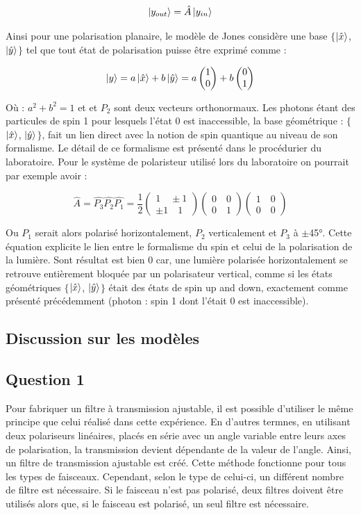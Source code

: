 \documentclass[11pt,letterpaper]{article}
\newcommand*{\Coord}[2]{%
    \begin{pmatrix} 
      #1\\ 
      #2 
    \end{pmatrix}}
\begin{document}
\begin{equation*}
    \ket{y_{out}} = \hat{A}\ket{y_{in}}
\end{equation*}

Ainsi pour une polarisation planaire, le modèle de Jones considère une base $\{$$\ket{\hat{x}}$, $\ket{\hat{y}}$$\}$ tel que tout état de polarisation puisse être exprimé comme :

\begin{equation*}
    \ket{y} = a\ket{\hat{x}} + b\ket{\hat{y}} = a\Coord{1}{0} + b\Coord{0}{1}
\end{equation*}

Où : $a^2 + b^2 = 1$ et et $P_2$  sont deux vecteurs orthonormaux. Les photons étant des particules de spin 1 pour lesquels l'état 0 est inaccessible, la base géométrique : $\{$$\ket{\hat{x}}$, $\ket{\hat{y}}$$\}$, fait un lien direct avec la notion de spin quantique au niveau de son formalisme. Le détail de ce formalisme est présenté dans le procédurier du laboratoire. Pour le système de polaristeur utilisé lors du laboratoire on pourrait par exemple avoir : 

\begin{equation*}
    \hat{A} = \hat{P_3}\hat{P_2}\hat{P_1} = \frac{1}{2}\Coord{1 \quad \pm 1}{\pm 1 \quad 1}\Coord{0 \quad 0}{0 \quad 1}\Coord{1 \quad 0}{0 \quad 0}
\end{equation*}

Ou $P_1$ serait alors polarisé horizontalement, $P_2$ verticalement et $P_3$ à $\pm$45°. Cette équation explicite le lien entre le formalisme du spin et celui de la polarisation de la lumière. Sont résultat est bien 0 car, une lumière polarisée horizontalement se retrouve entièrement bloquée par un polarisateur vertical, comme si les états géométriques $\{$$\ket{\hat{x}}$, $\ket{\hat{y}}$$\}$ était des états de spin up and down, exactement comme présenté précédemment (photon : spin 1 dont l'était 0 est inaccessible).

\subsection{Discussion sur les modèles}

\subsection{Question 1}
Pour fabriquer un filtre à transmission ajustable, il est possible d'utiliser le même principe que celui réalisé dans cette expérience. En d'autres termnes, en utilisant deux polariseurs linéaires, placés en série avec un angle variable entre leurs axes de polarisation, la transmission devient dépendante de la valeur de l'angle. Ainsi, un filtre de transmission ajustable est créé. Cette méthode fonctionne pour tous les types de faisceaux. Cependant, selon le type de celui-ci, un différent nombre de filtre est nécessaire. Si le faisceau n'est pas polarisé, deux filtres doivent être utilisés alors que, si le faisceau est polarisé, un seul filtre est nécessaire.
\end{document}
